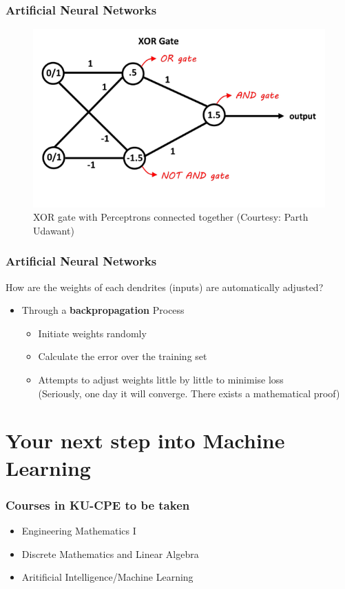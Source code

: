 \documentclass[aspectratio=169]{beamer}
\begin{document}
\begin{frame}
	\frametitle{Artificial Neural Networks}
	\begin{center}
		\begin{figure}
			\includegraphics[width=0.7\linewidth,height=0.7\textheight,keepaspectratio]{imgs/xor_nn.png}
			\caption{XOR gate with Perceptrons connected together (Courtesy: Parth Udawant)}
		\end{figure}
	\end{center}
\end{frame}

\begin{frame}
	\frametitle{Artificial Neural Networks}
	How are the weights of each dendrites (inputs) are automatically adjusted?
	\begin{itemize}
		\item<2-> Through a \textbf{backpropagation} Process
		\begin{itemize}
			\item<3-> Initiate weights randomly
			\item<4-> Calculate the error over the training set
			\item<5-> Attempts to adjust weights little by little to minimise loss\\
			{\onslide<6-> \tiny (Seriously, one day it will converge. There exists a mathematical proof)}
		\end{itemize}
	\end{itemize}
\end{frame}

\section{Your next step into Machine Learning}

\begin{frame}
	\frametitle{Courses in KU-CPE to be taken}
	\begin{itemize}
		\item Engineering Mathematics I
		\item Discrete Mathematics and Linear Algebra
		\item Aritificial Intelligence/Machine Learning
	\end{itemize}
\end{frame}
\end{document}
